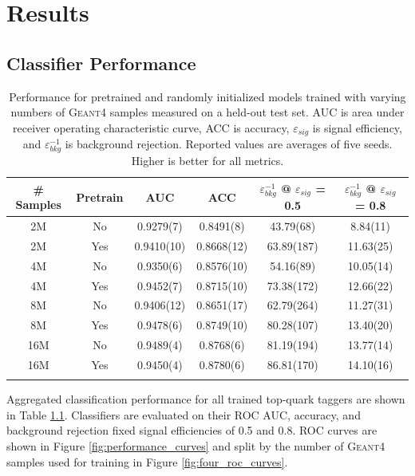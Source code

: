 \chapter{Results}

\section{Classifier Performance}

\begin{table}[]
\centering
    \begin{tabular}{c|c|c|c|c|c}
    \hhline{======}
    \# Samples & Pretrain & AUC & ACC & $\varepsilon_{bkg}^{-1}$ @ $\varepsilon_{sig}$ = 0.5  & $\varepsilon_{bkg}^{-1}$ @ $\varepsilon_{sig}$ = 0.8 \\ \hline
    2M  & No  & 0.9279(7) & 0.8491(8) & 43.79(68) & 8.84(11)  \\
    2M  & Yes & 0.9410(10) & 0.8668(12) & 63.89(187) & 11.63(25) \\
    4M  & No  & 0.9350(6) & 0.8576(10) & 54.16(89) & 10.05(14) \\
    4M  & Yes & 0.9452(7) & 0.8715(10) & 73.38(172) & 12.66(22) \\
    8M  & No  & 0.9406(12) & 0.8651(17) & 62.79(264) & 11.27(31) \\
    8M  & Yes & 0.9478(6) & 0.8749(10) & 80.28(107) & 13.40(20) \\
    16M & No  & 0.9489(4) & 0.8768(6) & 81.19(194) & 13.77(14) \\
    16M & Yes & 0.9450(4) & 0.8780(6) & 86.81(170) & 14.10(16) \\
    \hhline{======}
    \end{tabular}
    \caption{Performance for pretrained and randomly initialized models trained with varying numbers of \textsc{Geant4} samples measured on a held-out test set. AUC is area under receiver operating characteristic curve, ACC is accuracy, $\varepsilon_{sig}$ is signal efficiency, and $\varepsilon_{bkg}^{-1}$ is background rejection. Reported values are averages of five seeds. Higher is better for all metrics.}
    \label{tab:results}
\end{table}

Aggregated classification performance for all trained top-quark taggers are shown in Table \ref{tab:results}. Classifiers are evaluated on their ROC AUC, accuracy, and background rejection fixed signal efficiencies of 0.5 and 0.8. ROC curves are shown in Figure \ref{fig:performance_curves} and split by the number of \textsc{Geant4} samples used for training in Figure \ref{fig:four_roc_curves}.


